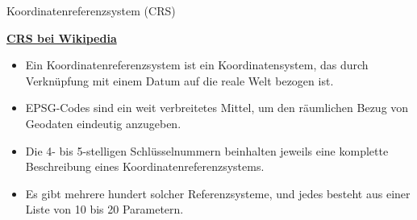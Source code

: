 \documentclass[ignorenonframetext,]{beamer}
\providecommand{\tightlist}{%
  \setlength{\itemsep}{0pt}\setlength{\parskip}{0pt}}
\begin{document}
\begin{frame}{Koordinatenreferenzsystem (CRS)}
\protect\hypertarget{koordinatenreferenzsystem-crs}{}

\begin{block}{\href{}{\textbf{CRS bei Wikipedia}}}

\begin{itemize}
\tightlist
\item
  Ein Koordinatenreferenzsystem ist ein Koordinatensystem, das durch
  Verknüpfung mit einem Datum auf die reale Welt bezogen ist.
\item
  EPSG-Codes sind ein weit verbreitetes Mittel, um den räumlichen Bezug
  von Geodaten eindeutig anzugeben.
\item
  Die 4- bis 5-stelligen Schlüsselnummern beinhalten jeweils eine
  komplette Beschreibung eines Koordinatenreferenzsystems.
\item
  Es gibt mehrere hundert solcher Referenzsysteme, und jedes besteht aus
  einer Liste von 10 bis 20 Parametern.
\end{itemize}

\end{block}

\end{frame}
\end{document}
